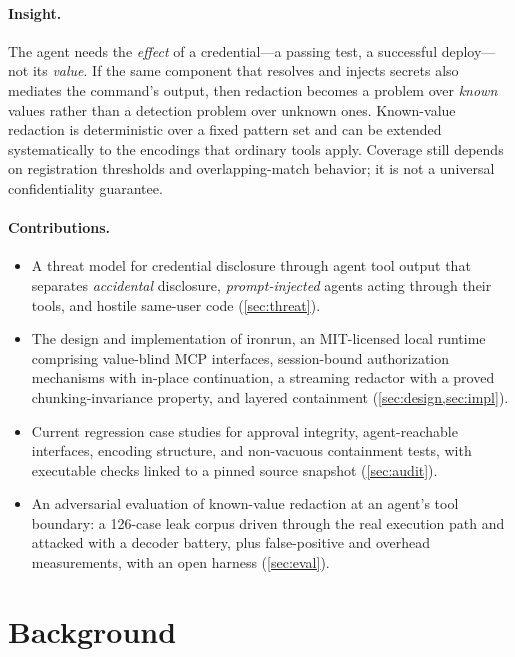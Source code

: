 \documentclass[10pt,twocolumn]{article}
\newcommand{\sys}{\textsf{ironrun}}
\begin{document}
\paragraph{Insight.} The agent needs the \emph{effect} of a credential---a
passing test, a successful deploy---not its \emph{value}. If the same component
that resolves and injects secrets also mediates the command's output, then
redaction becomes a problem over \emph{known} values rather than a detection
problem over unknown ones. Known-value redaction is deterministic over a fixed pattern set and can be
extended systematically to the encodings that ordinary tools apply. Coverage
still depends on registration thresholds and overlapping-match behavior; it is
not a universal confidentiality guarantee.

\paragraph{Contributions.}
\begin{itemize}
\item A threat model for credential disclosure through agent tool output that
  separates \emph{accidental} disclosure, \emph{prompt-injected} agents acting
  through their tools, and hostile same-user code (\cref{sec:threat}).
\item The design and implementation of \sys{}, an MIT-licensed local runtime
  comprising value-blind MCP interfaces, session-bound authorization mechanisms with
  in-place continuation, a streaming redactor with a proved chunking-invariance
  property, and layered containment (\cref{sec:design,sec:impl}).
\item Current regression case studies for approval integrity, agent-reachable
  interfaces, encoding structure, and non-vacuous containment tests, with
  executable checks linked to a pinned source snapshot (\cref{sec:audit}).
\item An adversarial evaluation of known-value redaction
  at an agent's tool boundary: a 126-case leak corpus driven through the real
  execution path and attacked with a decoder battery, plus false-positive and
  overhead measurements, with an open harness (\cref{sec:eval}).
\end{itemize}

\section{Background}
\label{sec:background}
\end{document}
